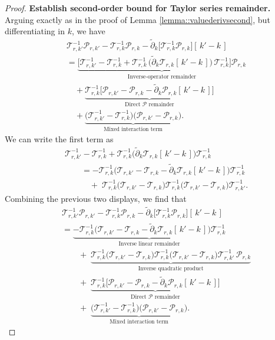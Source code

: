 \documentclass[11pt]{article}
\newcommand{\adk}{\widetilde{\partial}_k}
\theoremstyle{plain}
\begin{document}
\begin{proof}
\noindent \textbf{Establish second-order bound for Taylor series remainder.} Arguing exactly as in the proof of Lemma \ref{lemma::valuederivsecond}, but differentiating in \(k\), we have
\begin{align*}
&\mathcal{T}_{r,k'}^{-1}\mathcal{P}_{r,k'}
 - \mathcal{T}_{r,k}^{-1}\mathcal{P}_{r,k}
 - \adk\!\big[\mathcal{T}_{r,k}^{-1}\mathcal{P}_{r,k}\big][\,k' - k\,] \\
&= \underbrace{\Big[\mathcal{T}_{r,k'}^{-1} - \mathcal{T}_{r,k}^{-1}
         + \mathcal{T}_{r,k}^{-1}\,\big(\adk \mathcal{T}_{r,k}[\,k' - k\,]\big)\,
           \mathcal{T}_{r,k}^{-1}\Big]\mathcal{P}_{r,k}}_{\text{Inverse-operator remainder}} \\
&\quad + \underbrace{\mathcal{T}_{r,k}^{-1}\Big[\mathcal{P}_{r,k'} - \mathcal{P}_{r,k}
           - \adk \mathcal{P}_{r,k}[\,k' - k\,]\Big]}_{\text{Direct $\mathcal{P}$ remainder}} \\
&\quad + \underbrace{\Big(\mathcal{T}_{r,k'}^{-1} - \mathcal{T}_{r,k}^{-1}\Big)
       \Big(\mathcal{P}_{r,k'} - \mathcal{P}_{r,k}\Big)}_{\text{Mixed interaction term}}.
\end{align*}
We can write the first term as
\[
\begin{aligned}
&\mathcal{T}_{r,k'}^{-1} - \mathcal{T}_{r,k}^{-1}
  + \mathcal{T}_{r,k}^{-1}\big(\adk \mathcal{T}_{r,k}[\,k' - k\,]\big)\mathcal{T}_{r,k}^{-1} \\
&\qquad= - \mathcal{T}_{r,k}^{-1}\Big(\mathcal{T}_{r,k'} - \mathcal{T}_{r,k}  - \adk \mathcal{T}_{r,k}[\,k' - k\,]\big) \mathcal{T}_{r,k}^{-1} \\
&\qquad\quad +\; \mathcal{T}_{r,k}^{-1}\big(\mathcal{T}_{r,k'} - \mathcal{T}_{r,k}\big)\mathcal{T}_{r,k}^{-1}\big(\mathcal{T}_{r,k'} - \mathcal{T}_{r,k}\big)\mathcal{T}_{r,k'}^{-1}.
\end{aligned}
\]
Combining the previous two displays, we find that
\begin{align*}
&\mathcal{T}_{r,k'}^{-1}\mathcal{P}_{r,k'}
 - \mathcal{T}_{r,k}^{-1}\mathcal{P}_{r,k}
 - \adk\!\big[\mathcal{T}_{r,k}^{-1}\mathcal{P}_{r,k}\big][\,k' - k\,] \\
&=
\underbrace{- \mathcal{T}_{r,k}^{-1}\Big(\mathcal{T}_{r,k'} - \mathcal{T}_{r,k}  - \adk \mathcal{T}_{r,k}[\,k' - k\,]\big) \mathcal{T}_{r,k}^{-1} }_{\text{Inverse linear remainder}} \\
&\qquad+\;
\underbrace{\mathcal{T}_{r,k}^{-1}\big(\mathcal{T}_{r,k'} - \mathcal{T}_{r,k}\big)\mathcal{T}_{r,k}^{-1}\big(\mathcal{T}_{r,k'} - \mathcal{T}_{r,k}\big)\mathcal{T}_{r,k'}^{-1}\,\mathcal{P}_{r,k}}_{\text{Inverse quadratic product}} \\
&\qquad+\;
\underbrace{\mathcal{T}_{r,k}^{-1}\Big[\mathcal{P}_{r,k'} - \mathcal{P}_{r,k}
           - \adk \mathcal{P}_{r,k}[\,k' - k\,]\Big]}_{\text{Direct $\mathcal{P}$ remainder}} \\
&\qquad+\;
\underbrace{\Big(\mathcal{T}_{r,k'}^{-1} - \mathcal{T}_{r,k}^{-1}\Big)
       \Big(\mathcal{P}_{r,k'} - \mathcal{P}_{r,k}\Big)}_{\text{Mixed interaction term}}.
\end{align*}





\end{proof}
\end{document}
